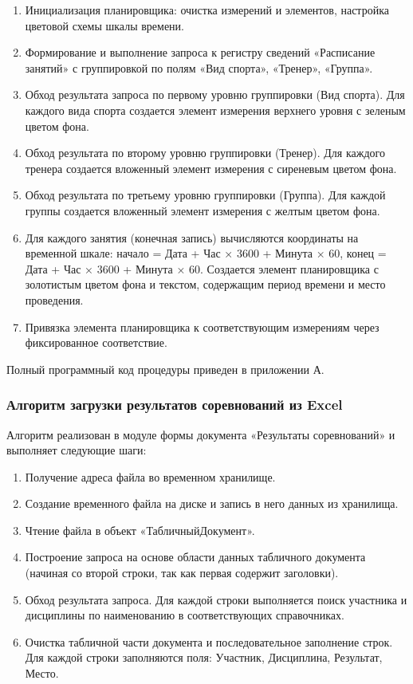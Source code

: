 \begin{enumerate}
	\item Инициализация планировщика: очистка измерений и элементов, настройка цветовой схемы шкалы времени.
	\item Формирование и выполнение запроса к регистру сведений «Расписание занятий» с группировкой по полям «Вид спорта», «Тренер», «Группа».
	\item Обход результата запроса по первому уровню группировки (Вид спорта). Для каждого вида спорта создается элемент измерения верхнего уровня с зеленым цветом фона.
	\item Обход результата по второму уровню группировки (Тренер). Для каждого тренера создается вложенный элемент измерения с сиреневым цветом фона.
	\item Обход результата по третьему уровню группировки (Группа). Для каждой группы создается вложенный элемент измерения с желтым цветом фона.
	\item Для каждого занятия (конечная запись) вычисляются координаты на временной шкале: начало = Дата + Час × 3600 + Минута × 60, конец = Дата + Час × 3600 + Минута × 60. Создается элемент планировщика с золотистым цветом фона и текстом, содержащим период времени и место проведения.
	\item Привязка элемента планировщика к соответствующим измерениям через фиксированное соответствие.
\end{enumerate}

Полный программный код процедуры приведен в приложении А.

\subsubsection{Алгоритм загрузки результатов соревнований из Excel}

Алгоритм реализован в модуле формы документа «Результаты соревнований» и выполняет следующие шаги:

\begin{enumerate}
	\item Получение адреса файла во временном хранилище.
	\item Создание временного файла на диске и запись в него данных из хранилища.
	\item Чтение файла в объект «ТабличныйДокумент».
	\item Построение запроса на основе области данных табличного документа (начиная со второй строки, так как первая содержит заголовки).
	\item Обход результата запроса. Для каждой строки выполняется поиск участника и дисциплины по наименованию в соответствующих справочниках.
	\item Очистка табличной части документа и последовательное заполнение строк. Для каждой строки заполняются поля: Участник, Дисциплина, Результат, Место.
\end{enumerate}

